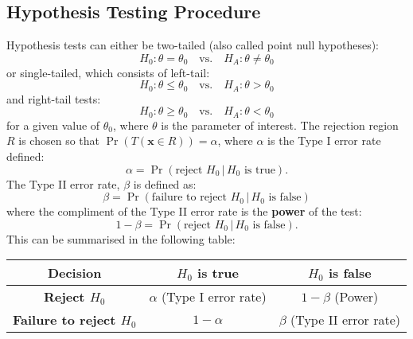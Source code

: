 \documentclass{article}
\begin{document}
\subsection{Hypothesis Testing Procedure}
Hypothesis tests can either be two-tailed (also called point null
hypotheses):
\begin{equation*}
    H_0: \theta = \theta_0 \quad \text{vs.} \quad H_A: \theta \neq \theta_0
\end{equation*}
or single-tailed, which consists of left-tail:
\begin{equation*}
    H_0: \theta \leq \theta_0 \quad \text{vs.} \quad H_A: \theta > \theta_0
\end{equation*}
and right-tail tests:
\begin{equation*}
    H_0: \theta \geq \theta_0 \quad \text{vs.} \quad H_A: \theta < \theta_0
\end{equation*}
for a given value of \(\theta_0\), where \(\theta\) is the parameter of
interest. The rejection region \(R\) is chosen so that
\(\Pr{\left( T\left( \symbf{x} \in R \right) \right)} = \alpha\), where
\(\alpha\) is the Type I error rate defined:
\begin{equation*}
    \alpha = \Pr{\left( \text{reject \(H_0\)} \,\vert\, \text{\(H_0\) is true} \right)}.
\end{equation*}
The Type II error rate, \(\beta\) is defined as:
\begin{equation*}
    \beta = \Pr{\left( \text{failure to reject \(H_0\)} \,\vert\, \text{\(H_0\) is false} \right)}
\end{equation*}
where the compliment of the Type II error rate is the \textbf{power} of
the test:
\begin{equation*}
    1 - \beta = \Pr{\left( \text{reject \(H_0\)} \,\vert\, \text{\(H_0\) is false} \right)}.
\end{equation*}
This can be summarised in the following table:
\begin{center}
    \begin{tabular}{c|cc}
        \toprule
        \textbf{Decision}                  & \textbf{\(H_0\) is true}       & \textbf{\(H_0\) is false}      \\
        \midrule
        \textbf{Reject \(H_0\)}            & \(\alpha\) (Type I error rate) & \(1 - \beta\) (Power)          \\
        \textbf{Failure to reject \(H_0\)} & \(1 - \alpha\)                 & \(\beta\) (Type II error rate) \\
        \bottomrule
    \end{tabular}
\end{center}
\end{document}
